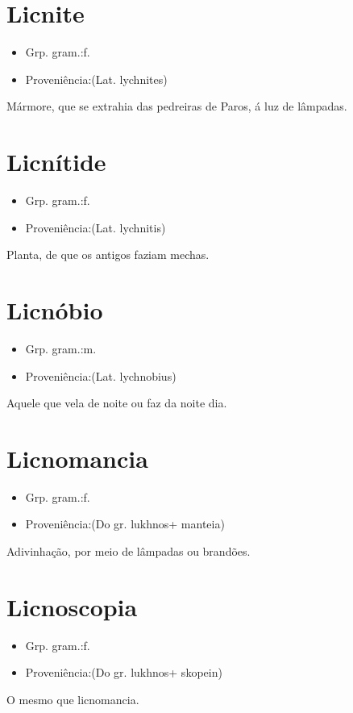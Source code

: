 \section{Licnite}
\begin{itemize}
\item {Grp. gram.:f.}
\end{itemize}
\begin{itemize}
\item {Proveniência:(Lat. \textunderscore lychnites\textunderscore )}
\end{itemize}
Mármore, que se extrahia das pedreiras de Paros, á luz de lâmpadas.
\section{Licnítide}
\begin{itemize}
\item {Grp. gram.:f.}
\end{itemize}
\begin{itemize}
\item {Proveniência:(Lat. \textunderscore lychnitis\textunderscore )}
\end{itemize}
Planta, de que os antigos faziam mechas.
\section{Licnóbio}
\begin{itemize}
\item {Grp. gram.:m.}
\end{itemize}
\begin{itemize}
\item {Proveniência:(Lat. \textunderscore lychnobius\textunderscore )}
\end{itemize}
Aquele que vela de noite ou faz da noite dia.
\section{Licnomancia}
\begin{itemize}
\item {Grp. gram.:f.}
\end{itemize}
\begin{itemize}
\item {Proveniência:(Do gr. \textunderscore lukhnos\textunderscore  + \textunderscore manteia\textunderscore )}
\end{itemize}
Adivinhação, por meio de lâmpadas ou brandões.
\section{Licnoscopia}
\begin{itemize}
\item {Grp. gram.:f.}
\end{itemize}
\begin{itemize}
\item {Proveniência:(Do gr. \textunderscore lukhnos\textunderscore  + \textunderscore skopein\textunderscore )}
\end{itemize}
O mesmo que \textunderscore licnomancia\textunderscore .
